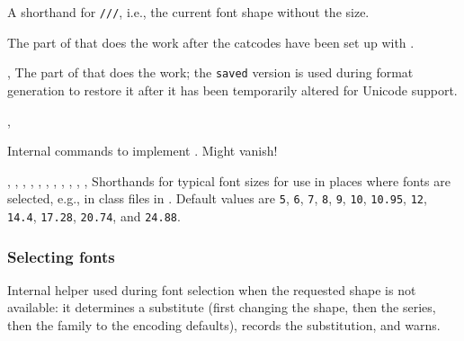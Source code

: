 \documentclass{l3in2edoc}
\begin{document}
\begin{function}[EXP]
  {
    \curr@fontshape
  }
  A shorthand for
  \texttt{/}\texttt{/}\texttt{/},
  i.e., the current font shape without the size.
\end{function}




\begin{function}[int]
  {
    \DeclareFontShape@
  }
  The part of  that does the work after the
  catcodes have been set up with .
\end{function}



\begin{function}[int]
  {
    \DeclareFontEncoding@,
    \DeclareFontEncoding@saved
  }
  The part of  that does the work; the
  \texttt{saved} version is used during format generation to restore
  it after it has been temporarily altered for Unicode support.
\end{function}



\begin{function}[int]
  {
    \@DeclareEncodingSubset,
    \DeclareEncodingSubset@aux
  }

  Internal commands to implement . Might
  vanish!
\end{function}



\begin{function}[]
  {
    \@vpt,
    \@vipt,
    \@viipt,
    \@viiipt,
    \@ixpt,
    \@xpt,
    \@xipt,
    \@xiipt,
    \@xivpt,
    \@xviipt,
    \@xxpt,
    \@xxvpt
  }
  Shorthands for typical font sizes for use in places where fonts are
  selected, e.g., in class files in .
  Default values are \texttt{5}, \texttt{6}, \texttt{7},
  \texttt{8}, \texttt{9}, \texttt{10}, \texttt{10.95}, \texttt{12},
  \texttt{14.4}, \texttt{17.28}, \texttt{20.74}, and \texttt{24.88}.
\end{function}




\subsubsection{Selecting fonts}



\begin{function}[int]
  {
    \wrong@fontshape
  }
  Internal helper used during font selection when the requested shape
  is not available: it determines a substitute (first changing the
  shape, then the series, then the family to the encoding defaults),
  records the substitution, and warns.
\end{function}
\end{document}
